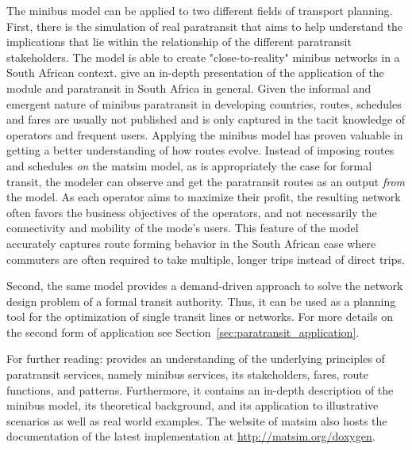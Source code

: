 The minibus model can be applied to two different fields of transport planning. First, there is the simulation of real paratransit that aims to help understand the implications that lie within the relationship of the different paratransit stakeholders. The model is able to create "close-to-reality" minibus networks in a South African context. \citet[][]{NeumannEtAl2014MinibusRSA} give an in-depth presentation of the application of the module and paratransit in South Africa in general. Given the informal and emergent nature of minibus paratransit in developing countries, routes, schedules and fares are usually not published and is only captured in the tacit knowledge of operators and frequent users. Applying the minibus model has proven valuable in getting a better understanding of how routes evolve. Instead of imposing routes and schedules \emph{on} the \gls{matsim} model, as is appropriately the case for formal transit, the modeler can observe and get the paratransit routes as an output \emph{from} the model. As each operator aims to maximize their profit, the resulting network often favors the business objectives of the operators, and not necessarily the connectivity and mobility of the mode's users. This feature of the model accurately captures route forming behavior in the South African case where commuters are often required to take multiple, longer trips instead of direct trips.

Second, the same model provides a demand-driven approach to solve the network design problem of a formal transit authority. Thus, it can be used as a planning tool for the optimization of single transit lines or networks. For more details on the second form of application see Section~\ref{sec:paratransit_application}.

For further reading: \citet[][]{Neumann_PhDThesis_2014} provides an understanding of the underlying principles of paratransit services, namely minibus services, its stakeholders, fares, route functions, and patterns. Furthermore, it contains an in-depth description of the minibus model, its theoretical background, and its application to illustrative scenarios as well as real world examples. The website of \gls{matsim} also hosts the documentation of the latest implementation at \url{http://matsim.org/doxygen}.

